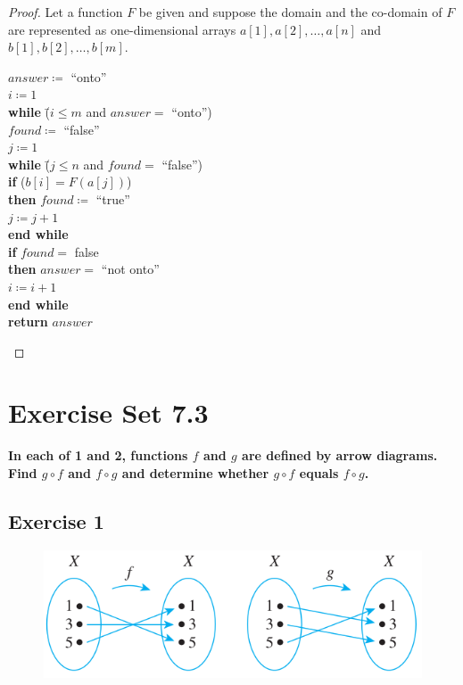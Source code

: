 \documentclass[14pt]{extarticle}
\newcommand{\cy}{\color{cyan}}
\begin{document}
\begin{proof}
Let a function $F$ be given and suppose the domain and the co-domain of $F$ are represented as one-dimensional arrays 
\(a[1], a[2], \ldots, a[n]\) and \(b[1], b[2], \ldots, b[m]\).

\begin{tabbing}
\(answer \coloneqq\) ``onto'' \\
\(i \coloneqq 1\) \\
{\bf while} \= (\(i\leq m\) and \(answer = \) ``onto'') \\
            \> \(found \coloneqq\) ``false'' \\
            \> \(j \coloneqq 1\) \\
            \> {\bf while} \= (\(j \leq n\) and \(found =\) ``false'') \\
            \>             \> {\bf if} (\(b[i]=F(a[j])\))\\
            \>             \> {\bf then} \(found \coloneqq \) ``true'' \\
            \>             \> \(j \coloneqq j + 1\) \\
            \> {\bf end while} \\
            \> {\bf if} \(found = \) false \\
            \> {\bf then} \(answer = \) ``not onto'' \\
\(i \coloneqq i + 1\) \\
{\bf end while} \\
{\bf return} $answer$
\end{tabbing}
\end{proof}

\section{Exercise Set 7.3}

{\bf \cy In each of 1 and 2, functions $f$ and $g$ are defined by arrow diagrams. Find \(g \circ f\) and 
\(f \circ g\) and determine whether \(g \circ f\) equals \(f \circ g\).}

\subsection{Exercise 1}
\begin{figure}[ht!]
\centering
\includegraphics[scale=0.5]{../images/7.3.1.png}
\end{figure}
\end{document}
